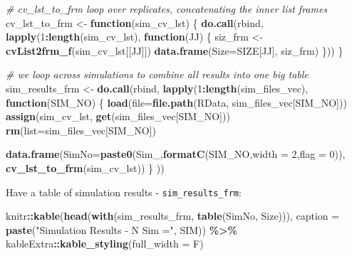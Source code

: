 \documentclass[
]{book}
\newenvironment{Shaded}{\begin{snugshade}}{\end{snugshade}}
\newcommand{\CommentTok}[1]{\textcolor[rgb]{0.56,0.35,0.01}{\textit{#1}}}
\newcommand{\ControlFlowTok}[1]{\textcolor[rgb]{0.13,0.29,0.53}{\textbf{#1}}}
\newcommand{\DataTypeTok}[1]{\textcolor[rgb]{0.13,0.29,0.53}{#1}}
\newcommand{\DecValTok}[1]{\textcolor[rgb]{0.00,0.00,0.81}{#1}}
\newcommand{\KeywordTok}[1]{\textcolor[rgb]{0.13,0.29,0.53}{\textbf{#1}}}
\newcommand{\NormalTok}[1]{#1}
\newcommand{\OperatorTok}[1]{\textcolor[rgb]{0.81,0.36,0.00}{\textbf{#1}}}
\newcommand{\StringTok}[1]{\textcolor[rgb]{0.31,0.60,0.02}{#1}}
\begin{document}
\begin{Shaded}
\begin{Highlighting}[]
\CommentTok{\# cv\_lst\_to\_frm loop over replicates, concatenating the inner list frames}
\NormalTok{cv\_lst\_to\_frm <{-}}\StringTok{ }\ControlFlowTok{function}\NormalTok{(sim\_cv\_lst) \{}
 \KeywordTok{do.call}\NormalTok{(}\StringTok{\textquotesingle{}rbind\textquotesingle{}}\NormalTok{, }\KeywordTok{lapply}\NormalTok{(}\DecValTok{1}\OperatorTok{:}\KeywordTok{length}\NormalTok{(sim\_cv\_lst),}
  \ControlFlowTok{function}\NormalTok{(JJ) \{}
\NormalTok{    siz\_frm <{-}}\StringTok{ }\KeywordTok{cvList2frm\_f}\NormalTok{(sim\_cv\_lst[[JJ]])}
    \KeywordTok{data.frame}\NormalTok{(}\DataTypeTok{Size=}\NormalTok{SIZE[JJ], siz\_frm)}
\NormalTok{  \}))}
\NormalTok{\}}

\CommentTok{\# we loop across simulations to combine all results into one big table}
\NormalTok{sim\_results\_frm <{-}}\StringTok{ }\KeywordTok{do.call}\NormalTok{(}\StringTok{\textquotesingle{}rbind\textquotesingle{}}\NormalTok{, }\KeywordTok{lapply}\NormalTok{(}\DecValTok{1}\OperatorTok{:}\KeywordTok{length}\NormalTok{(sim\_files\_vec),}
 \ControlFlowTok{function}\NormalTok{(SIM\_NO) \{}
  \KeywordTok{load}\NormalTok{(}\DataTypeTok{file=}\KeywordTok{file.path}\NormalTok{(}\StringTok{\textquotesingle{}RData\textquotesingle{}}\NormalTok{, sim\_files\_vec[SIM\_NO]))}
  \KeywordTok{assign}\NormalTok{(}\StringTok{\textquotesingle{}sim\_cv\_lst\textquotesingle{}}\NormalTok{, }\KeywordTok{get}\NormalTok{(sim\_files\_vec[SIM\_NO]))}
  \KeywordTok{rm}\NormalTok{(}\DataTypeTok{list=}\NormalTok{sim\_files\_vec[SIM\_NO])}
  
  \KeywordTok{data.frame}\NormalTok{(}\DataTypeTok{SimNo=}\KeywordTok{paste0}\NormalTok{(}\StringTok{\textquotesingle{}Sim\_\textquotesingle{}}\NormalTok{,}\KeywordTok{formatC}\NormalTok{(SIM\_NO,}\DataTypeTok{width =} \DecValTok{2}\NormalTok{,}\DataTypeTok{flag =} \DecValTok{0}\NormalTok{)), }\KeywordTok{cv\_lst\_to\_frm}\NormalTok{(sim\_cv\_lst))}
\NormalTok{\} }
\NormalTok{)) }
\end{Highlighting}
\end{Shaded}

Have a table of simulation results - \texttt{sim\_results\_frm}:

\begin{Shaded}
\begin{Highlighting}[]
\NormalTok{knitr}\OperatorTok{::}\KeywordTok{kable}\NormalTok{(}\KeywordTok{head}\NormalTok{(}\KeywordTok{with}\NormalTok{(sim\_results\_frm, }\KeywordTok{table}\NormalTok{(SimNo, Size))),}
  \DataTypeTok{caption =} \KeywordTok{paste}\NormalTok{(}\StringTok{"Simulation Results {-} N Sim ="}\NormalTok{, SIM)) }\OperatorTok{\%>\%}
\StringTok{   }\NormalTok{kableExtra}\OperatorTok{::}\KeywordTok{kable\_styling}\NormalTok{(}\DataTypeTok{full\_width =}\NormalTok{ F)}
\end{Highlighting}
\end{Shaded}
\end{document}
